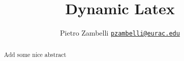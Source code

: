 \documentclass{article}
\title{Dynamic Latex}
\author{
	Pietro Zambelli\setcounter{restorecntr}{\value{footnote}}
	\texttt{\href{mailto:pietro.zambelli@eurac.edu}{pzambelli@eurac.edu}} \\
}
\begin{document}
\begin{abstract}

Add some nice abstract

\end{abstract}


\end{document}
